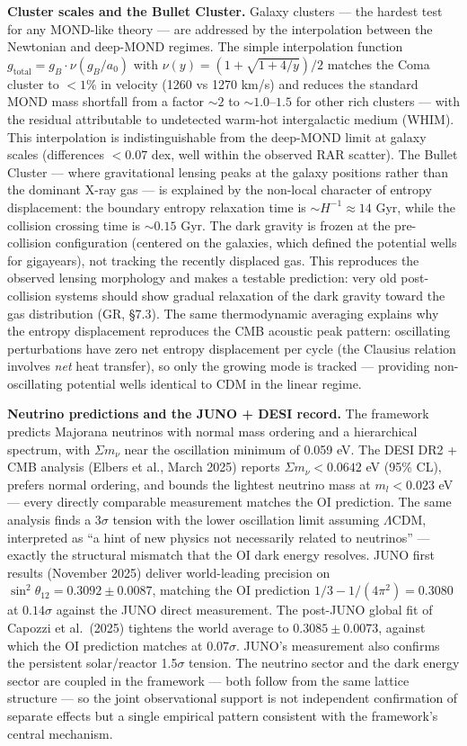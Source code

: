 \documentclass[
]{article}
\begin{document}
\textbf{Cluster scales and the Bullet Cluster.} Galaxy clusters --- the
hardest test for any MOND-like theory --- are addressed by the
interpolation between the Newtonian and deep-MOND regimes. The simple
interpolation function \(g_{\text{total}} = g_B \cdot \nu(g_B/a_0)\)
with \(\nu(y) = (1 + \sqrt{1+4/y})/2\) matches the Coma cluster to
\(< 1\%\) in velocity (1260 vs 1270 km/s) and reduces the standard MOND
mass shortfall from a factor \(\sim 2\) to \(\sim 1.0\)--\(1.5\) for
other rich clusters --- with the residual attributable to undetected
warm-hot intergalactic medium (WHIM). This interpolation is
indistinguishable from the deep-MOND limit at galaxy scales (differences
\(< 0.07\) dex, well within the observed RAR scatter). The Bullet
Cluster --- where gravitational lensing peaks at the galaxy positions
rather than the dominant X-ray gas --- is explained by the non-local
character of entropy displacement: the boundary entropy relaxation time
is \(\sim H^{-1} \approx 14\) Gyr, while the collision crossing time is
\(\sim 0.15\) Gyr. The dark gravity is frozen at the pre-collision
configuration (centered on the galaxies, which defined the potential
wells for gigayears), not tracking the recently displaced gas. This
reproduces the observed lensing morphology and makes a testable
prediction: very old post-collision systems should show gradual
relaxation of the dark gravity toward the gas distribution (GR, §7.3).
The same thermodynamic averaging explains why the entropy displacement
reproduces the CMB acoustic peak pattern: oscillating perturbations have
zero net entropy displacement per cycle (the Clausius relation involves
\emph{net} heat transfer), so only the growing mode is tracked ---
providing non-oscillating potential wells identical to CDM in the linear
regime.

\textbf{Neutrino predictions and the JUNO + DESI record.} The framework
predicts Majorana neutrinos with normal mass ordering and a hierarchical
spectrum, with \(\Sigma m_\nu\) near the oscillation minimum of 0.059
eV. The DESI DR2 + CMB analysis (Elbers et al., March 2025) reports
\(\Sigma m_\nu < 0.0642\) eV (95\% CL), prefers normal ordering, and
bounds the lightest neutrino mass at \(m_l < 0.023\) eV --- every
directly comparable measurement matches the OI prediction. The same
analysis finds a \(3\sigma\) tension with the lower oscillation limit
assuming \(\Lambda\)CDM, interpreted as ``a hint of new physics not
necessarily related to neutrinos'' --- exactly the structural mismatch
that the OI dark energy resolves. JUNO first results (November 2025)
deliver world-leading precision on
\(\sin^2\theta_{12} = 0.3092 \pm 0.0087\), matching the OI prediction
\(1/3 - 1/(4\pi^2) = 0.3080\) at \(0.14\sigma\) against the JUNO direct
measurement. The post-JUNO global fit of Capozzi et al.~(2025) tightens
the world average to \(0.3085 \pm 0.0073\), against which the OI
prediction matches at \(0.07\sigma\). JUNO's measurement also confirms
the persistent solar/reactor 1.5\(\sigma\) tension. The neutrino sector
and the dark energy sector are coupled in the framework --- both follow
from the same lattice structure --- so the joint observational support
is not independent confirmation of separate effects but a single
empirical pattern consistent with the framework's central mechanism.
\end{document}

